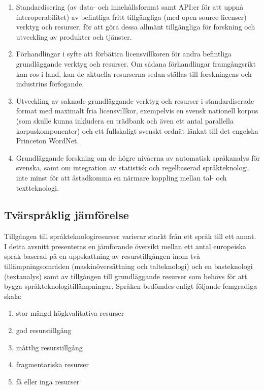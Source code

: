 \begin{multicols}{2}
\begin{enumerate}
\item Standardisering (av data- och innehållsformat samt API:er för
  att uppnå interoperabilitet) av befintliga fritt tillgängliga (med
  open source-licenser) verktyg och resurser, för att göra dessa
  allmänt tillgängliga för forskning och utveckling av produkter och
  tjänster.
\item Förhandlingar i syfte att förbättra licensvillkoren för andra
  befintliga grundläggande verktyg och resurser. Om sådana
  förhandlingar framgångsrikt kan ros i land, kan de aktuella
  resurserna sedan ställas till forskningens och industrins
  förfogande.
\item Utveckling av saknade grundläggande verktyg och resurser i
  standardiserade format med maximalt fria licensvillkor, exempelvis
  en svensk nationell korpus (som skulle kunna inkludera en trädbank
  och även ett antal parallella korpuskomponenter) \cite{SNK} och ett
  fullskaligt svenskt ordnät länkat till det engelska Princeton
  WordNet.
\item Grundläggande forskning om de högre nivåerna av automatisk
  språkanalys för svenska, samt om integration av statistisk och
  regelbaserad språkteknologi, inte minst för att åstadkomma en
  närmare koppling mellan \mbox{tal-} och textteknologi.
\end{enumerate}

\subsection{Tvärspråklig jämförelse}

Tillgången till språkteknologiresurser varierar starkt från ett språk
till ett annat. I detta avsnitt presenteras en jämförande översikt
mellan ett antal europeiska språk baserad på en uppskattning av
resurstillgången inom två tillämpningsområden (maskin\-över\-sätt\-ning och
talteknologi) och en basteknologi (text\-ana\-lys) samt av tillgången till
grundläggande resurser som behövs för att bygga
språkteknologitillämpningar. Språken bedömdes enligt följande
femgradiga skala:

\begin{enumerate}
\item stor mängd högkvalitativa resurser
\item god resurstillgång
\item måttlig resurstillgång
\item fragmentariska resurser
\item få eller inga resurser
\end{enumerate}


\end{multicols}
